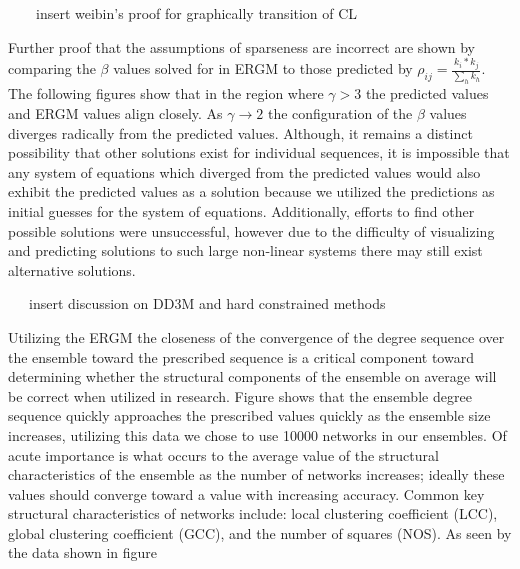 \documentclass[aip,graphicx,amsmath]{revtex4-1}
\begin{document}
~~~~insert weibin's proof for graphically transition of CL

Further proof that the assumptions of sparseness are incorrect are shown by comparing the $\beta$ values solved for in ERGM to those predicted by $\rho_{ij}=\frac{k_i*k_j}{\sum_h{k_h}}$. The following figures show that in the region where $\gamma>3$ the predicted values and ERGM values align closely. As $\gamma\to2$ the configuration of the $\beta$ values diverges radically from the predicted values. Although, it remains a distinct possibility that other solutions exist for individual sequences, it is impossible that any system of equations which diverged from the predicted values would also exhibit the predicted values as a solution because we utilized the predictions as initial guesses for the system of equations. Additionally, efforts to find other possible solutions were unsuccessful, however due to the difficulty of visualizing and predicting solutions to such large non-linear systems there may still exist alternative solutions.

~~~insert discussion on DD3M and hard constrained methods

Utilizing the ERGM the closeness of the convergence of the degree sequence over the ensemble toward the prescribed sequence is a critical component toward determining whether the structural components of the ensemble on average will be correct when utilized in research. Figure  shows that the ensemble degree sequence quickly approaches the prescribed values quickly as the ensemble size increases, utilizing this data we chose to use 10000 networks in our ensembles. Of acute importance is what occurs to the average value of the structural characteristics of the ensemble as the number of networks increases; ideally these values should converge toward a value with increasing accuracy. Common key structural characteristics of networks include: local clustering coefficient (LCC), global clustering coefficient (GCC), and the number of squares (NOS). As seen by the data shown in figure 


 





\end{document}
